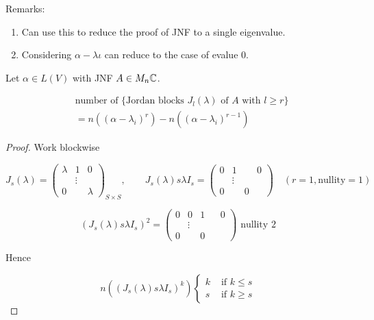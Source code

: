 \documentclass[a4paper]{article}
\begin{document}
Remarks:

\begin{enumerate}
	\item Can use this to reduce the proof of JNF to a single eigenvalue.
	
	\item Considering $ \alpha - \lambda \iota  $ can reduce to the case of evalue 0.

	
\end{enumerate} 


\begin{lemma} 
	Let $ \alpha \in L(V) $ with JNF $ A \in M_{n} \mathbb{C} $.
	
	\begin{align*}
	& \text{number of } \{  \text{Jordan blocks } J_{l}(\lambda) \text{ of } A \text{ with } l \geq r \} \\
	& = n \left( ( \alpha - \lambda_{i})^{r}   \right) - n \left(  ( \alpha - \lambda_{i} )^{r - 1} \right)  
	\end{align*}
\end{lemma}

\begin{proof}
	Work blockwise
	
	\[ J_{s}(\lambda) = \begin{pmatrix}
	\lambda & 1 & 0 \\
	& \vdots &\\
	0 & & \lambda
	\end{pmatrix}_{S \times S}, \qquad J_{s}( \lambda) s \lambda I_{s} = \begin{pmatrix}
	0 & 1 & & 0\\
	& \vdots & & \\
	0 & & 0
	\end{pmatrix} \quad (r = 1, \text{nullity} = 1 ) \]
	
	
	\[ ( J_{s}( \lambda) s \lambda I_{s})^{2} = \begin{pmatrix}
	0 & 0 & 1 & & 0\\
	& \vdots & & \\
	0 & & 0
	\end{pmatrix} \text{ nullity } 2 \]
	
	Hence 
	
	\[ n( ( J_{s}( \lambda) s \lambda I_{s})^{k} ) \begin{cases}  k   & \text{ if } k \leq s \\ s & \text{ if } k \geq s \end{cases}\]
\end{proof}
\end{document}
